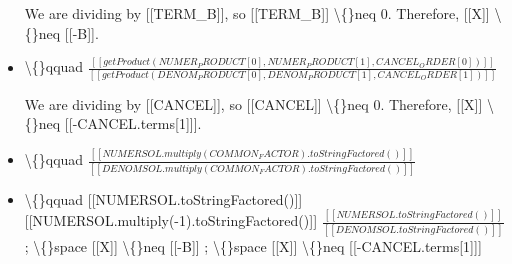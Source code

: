 \documentclass{article}
\begin{document}
\begin{itemize}
                We are dividing by [[TERM\_B]], so [[TERM\_B]] \textbackslash\{\}neq 0.
                Therefore, [[X]] \textbackslash\{\}neq [[-B]].
  \item \textbackslash\{\}qquad $\frac{
                    [[getProduct(NUMER_PRODUCT[0], NUMER_PRODUCT[1], CANCEL_ORDER[0])]]}{
                    [[getProduct(DENOM_PRODUCT[0], DENOM_PRODUCT[1], CANCEL_ORDER[1])]]}$
                

                We are dividing by [[CANCEL]], so [[CANCEL]] \textbackslash\{\}neq 0.
                Therefore, [[X]] \textbackslash\{\}neq [[-CANCEL.terms[1]]].
  \item \textbackslash\{\}qquad
                    $\frac{[[NUMERSOL.multiply(COMMON_FACTOR).toStringFactored()]]}{[[DENOMSOL.multiply(COMMON_FACTOR).toStringFactored()]]}$
  \item \textbackslash\{\}qquad
                [[NUMERSOL.toStringFactored()]]
                [[NUMERSOL.multiply(-1).toStringFactored()]]
                $\frac{[[NUMERSOL.toStringFactored()]]}{[[DENOMSOL.toStringFactored()]]}$
                ; \textbackslash\{\}space [[X]] \textbackslash\{\}neq [[-B]]
                ; \textbackslash\{\}space [[X]] \textbackslash\{\}neq [[-CANCEL.terms[1]]]
\end{itemize}
\end{document}
